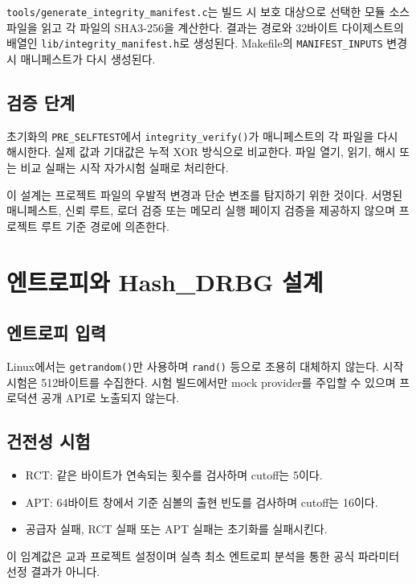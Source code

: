 \documentclass[11pt,a4paper]{article}
\begin{document}
\texttt{tools/generate\_integrity\_manifest.c}는 빌드 시 보호 대상으로 선택한
모듈 소스 파일을 읽고 각 파일의 SHA3-256을 계산한다. 결과는 경로와 32바이트
다이제스트의 배열인 \texttt{lib/integrity\_manifest.h}로 생성된다. Makefile의
\texttt{MANIFEST\_INPUTS} 변경 시 매니페스트가 다시 생성된다.

\subsection{검증 단계}

초기화의 \texttt{PRE\_SELFTEST}에서 \texttt{integrity\_verify()}가 매니페스트의
각 파일을 다시 해시한다. 실제 값과 기대값은 누적 XOR 방식으로 비교한다.
파일 열기, 읽기, 해시 또는 비교 실패는 시작 자가시험 실패로 처리한다.

이 설계는 프로젝트 파일의 우발적 변경과 단순 변조를 탐지하기 위한 것이다.
서명된 매니페스트, 신뢰 루트, 로더 검증 또는 메모리 실행 페이지 검증을
제공하지 않으며 프로젝트 루트 기준 경로에 의존한다.

\section{엔트로피와 Hash\_DRBG 설계}

\subsection{엔트로피 입력}

Linux에서는 \texttt{getrandom()}만 사용하며 \texttt{rand()} 등으로 조용히
대체하지 않는다. 시작 시험은 512바이트를 수집한다. 시험 빌드에서만 mock
provider를 주입할 수 있으며 프로덕션 공개 API로 노출되지 않는다.

\subsection{건전성 시험}

\begin{itemize}
  \item RCT: 같은 바이트가 연속되는 횟수를 검사하며 cutoff는 5이다.
  \item APT: 64바이트 창에서 기준 심볼의 출현 빈도를 검사하며 cutoff는 16이다.
  \item 공급자 실패, RCT 실패 또는 APT 실패는 초기화를 실패시킨다.
\end{itemize}

이 임계값은 교과 프로젝트 설정이며 실측 최소 엔트로피 분석을 통한 공식
파라미터 선정 결과가 아니다.
\end{document}

